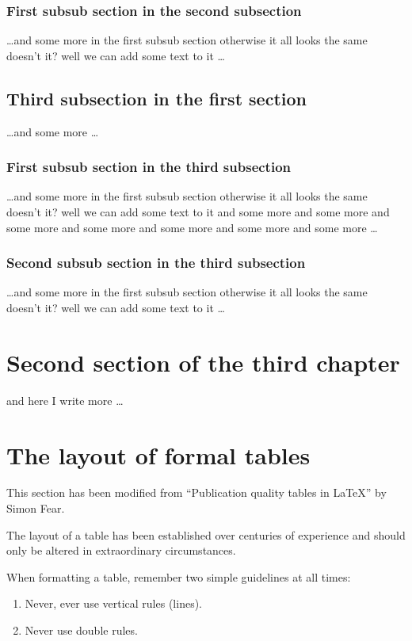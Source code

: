 \subsubsection{First subsub section in the second subsection}
\dots and some more in the first subsub section otherwise it all looks the same
doesn't it? well we can add some text to it \dots

\subsection{Third subsection in the first section}
\dots and some more \dots

\subsubsection{First subsub section in the third subsection}
\dots and some more in the first subsub section otherwise it all looks the same
doesn't it? well we can add some text to it and some more and some more and
some more and some more and some more and some more and some more \dots

\subsubsection{Second subsub section in the third subsection}
\dots and some more in the first subsub section otherwise it all looks the same
doesn't it? well we can add some text to it \dots

\section{Second section of the third chapter}
and here I write more \dots

\section{The layout of formal tables}
This section has been modified from ``Publication quality tables in \LaTeX*''
 by Simon Fear.

The layout of a table has been established over centuries of experience and 
should only be altered in extraordinary circumstances. 

When formatting a table, remember two simple guidelines at all times:

\begin{enumerate}
  \item Never, ever use vertical rules (lines).
  \item Never use double rules.
\end{enumerate}


